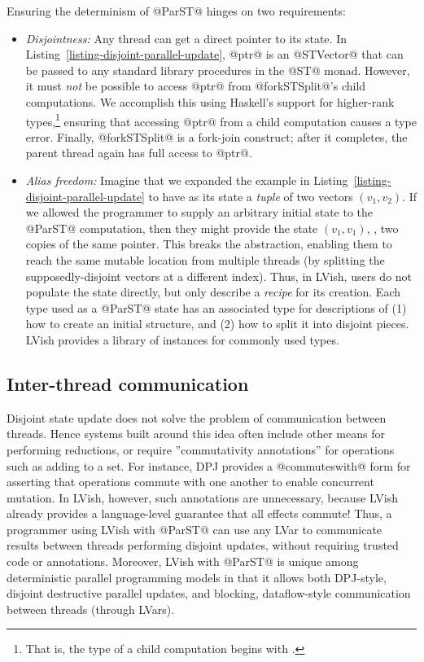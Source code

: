 Ensuring the determinism of @ParST@ hinges on two requirements:

\begin{itemize}
\item \emph{Disjointness:} Any thread can get a direct pointer to its
  state.  In Listing~\ref{listing-disjoint-parallel-update}, @ptr@ is
  an @STVector@ that can be passed to any standard library procedures
  in the @ST@ monad.  However, it must \emph{not} be possible to
  access @ptr@ from @forkSTSplit@'s child computations.  We accomplish
  this using Haskell's support for higher-rank types,\footnote{That
    is, the type of a child computation begins with .} ensuring that accessing @ptr@ from a child
  computation causes a type error.  Finally, @forkSTSplit@ is a
  fork-join construct; after it completes, the parent thread again has
  full access to @ptr@.

\item \emph{Alias freedom:} Imagine that we expanded the example in
  Listing~\ref{listing-disjoint-parallel-update} to have as its state
  a \emph{tuple} of two vectors $(v_1, v_2)$.  If we allowed the
  programmer to supply an arbitrary initial state to the @ParST@
  computation, then they might provide the state $(v_1, v_1)$, \ie,
  two copies of the same pointer.  This breaks the abstraction,
  enabling them to reach the same mutable location from multiple
  threads (by splitting the supposedly-disjoint vectors at a different
  index).  Thus, in LVish, users do not populate the state directly,
  but only describe a \emph{recipe} for its creation.  Each type used
  as a @ParST@ state has an associated type for descriptions of (1)
  how to create an initial structure, and (2) how to split it into
  disjoint pieces.  LVish provides a library of instances for commonly
  used types.
\end{itemize}

\subsection{Inter-thread communication}

Disjoint state update does not solve the problem of communication
between threads.  Hence systems built around this idea often include
other means for performing reductions, or require ''commutativity
annotations'' for operations such as adding to a set.  For instance,
DPJ provides a @commuteswith@ form for asserting that operations
commute with one another to enable concurrent mutation.  In LVish,
however, such annotations are unnecessary, because LVish already
provides a language-level guarantee that all effects commute!  Thus, a
programmer using LVish with @ParST@ can use any LVar to communicate
results between threads performing disjoint updates, without requiring
trusted code or annotations.  Moreover, LVish with @ParST@ is unique
among deterministic parallel programming models in that it allows both
DPJ-style, disjoint destructive parallel updates, and blocking,
dataflow-style communication between threads (through LVars).
